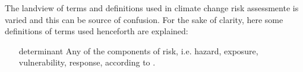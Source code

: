 The landview of terms and definitions used in climate change risk assessmente is varied and this can be source of confusion. For the sake of clarity, here some definitions of terms used henceforth are explained:
\begin{enumerate}
  \item[determinant] Any of the components of risk, i.e. hazard, exposure, vulnerability, response, according to \cite{2023SimpsonAdaptationTo}.
\end {enumerate}
